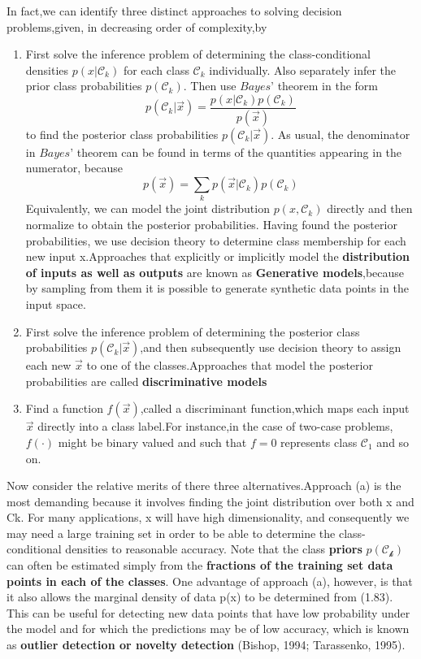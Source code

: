 In fact,we can identify three distinct approaches to solving decision problems,given, in decreasing order of complexity,by
\begin{enumerate} %
	\item First solve the inference problem of determining the class-conditional densities
	$p(x|\mathcal{C}_k)$ for each class $\mathcal{C}_k$ individually. Also separately infer the prior class probabilities $p(\mathcal{C}_k)$. Then use $Bayes’$ theorem in the form 
	\begin{equation}
	p(\mathcal{C}_k|\vec{x}) = \dfrac{p(x|\mathcal{C}_k)p(\mathcal{C}_k)}{p(\vec{x})}
	\end{equation}
	to find the posterior class probabilities $p(\mathcal{C}_k|\vec{x})$. As usual, the denominator in $Bayes’$ theorem can be found in terms of the quantities appearing in the
	numerator, because
	\begin{equation}
	p(\vec{x}) = \sum_k{p(\vec{x}|\mathcal{C}_k)p(\mathcal{C}_k)}
	\end{equation}
	Equivalently, we can model the joint distribution $p(x, \mathcal{C}_k)$ directly and then
	normalize to obtain the posterior probabilities. Having found the posterior
	probabilities, we use decision theory to determine class membership for each new input x.Approaches that explicitly or implicitly model the \textbf{distribution of inputs as well as outputs} are known as \textbf{Generative models},because by sampling from them it is possible to generate synthetic data points in the input space.
	\item First solve the inference problem of determining the posterior class probabilities $p(\mathcal{C}_k|\vec{x})$,and then subsequently use decision theory to assign each new $\vec{x}$ to one of the classes.Approaches that model the posterior probabilities are called \textbf{discriminative models}
	\item Find a function $f(\vec{x})$,called a discriminant function,which maps each input $\vec{x}$ directly into a class label.For instance,in the case of two-case problems,$f(\cdot)$ might be binary valued and such that $f=0$ represents class $\mathcal{C}_1$ and so on.
\end{enumerate}
Now consider the relative merits of there three alternatives.Approach (a) is the
most demanding because it involves finding the joint distribution over both x and
Ck. For many applications, x will have high dimensionality, and consequently we
may need a large training set in order to be able to determine the class-conditional
densities to reasonable accuracy. Note that the class \textbf{priors} $p(\mathcal{C_k})$ can often be estimated simply from the \textbf{fractions of the training set data points in each of the classes}. One advantage of approach (a), however, is that it also allows the marginal density
of data p(x) to be determined from (1.83). This can be useful for detecting new data
points that have low probability under the model and for which the predictions may
be of low accuracy, which is known as \textbf{outlier detection or novelty detection} (Bishop,
1994; Tarassenko, 1995).

